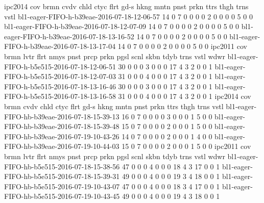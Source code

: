 ipc2014                                         cov  brmn  cvdv  chld  ctyc  flrt  gd-s  hkng  mntn  pnst  prkn  ttrs  thgh  trns  vstl  
bl1-eager-FIFO-h-b39eae-2016-07-18-12-06-57     14   0     7     0     0     0     0     2     0     0     0     0     5     0     0  
bl1-eager-FIFO-h-b39eae-2016-07-18-12-07-09     14   0     7     0     0     0     0     2     0     0     0     0     5     0     0  
bl1-eager-FIFO-h-b39eae-2016-07-18-13-16-52     14   0     7     0     0     0     0     2     0     0     0     0     5     0     0  
bl1-eager-FIFO-h-b39eae-2016-07-18-13-17-04     14   0     7     0     0     0     0     2     0     0     0     0     5     0     0  
ipc2011                                         cov  brmn  lvtr  flrt  nmys  pnst  prcp  prkn  pgsl  scnl  skbn  tdyb  trns  vstl  wdwr  
bl1-eager-FIFO-h-b5e515-2016-07-18-12-06-51     30   0     0     0     3     0     0     0     17    4     3     2     0     0     1  
bl1-eager-FIFO-h-b5e515-2016-07-18-12-07-03     31   0     0     0     4     0     0     0     17    4     3     2     0     0     1  
bl1-eager-FIFO-h-b5e515-2016-07-18-13-16-46     30   0     0     0     3     0     0     0     17    4     3     2     0     0     1  
bl1-eager-FIFO-h-b5e515-2016-07-18-13-16-58     31   0     0     0     4     0     0     0     17    4     3     2     0     0     1  
ipc2014                                         cov  brmn  cvdv  chld  ctyc  flrt  gd-s  hkng  mntn  pnst  prkn  ttrs  thgh  trns  vstl  
bl1-eager-FIFO-hb-b39eae-2016-07-18-15-39-13    16   0     7     0     0     0     0     3     0     0     0     1     5     0     0  
bl1-eager-FIFO-hb-b39eae-2016-07-18-15-39-48    15   0     7     0     0     0     0     2     0     0     0     1     5     0     0  
bl1-eager-FIFO-hb-b39eae-2016-07-19-10-43-26    14   0     7     0     0     0     0     2     0     0     0     1     4     0     0  
bl1-eager-FIFO-hb-b39eae-2016-07-19-10-44-03    15   0     7     0     0     0     0     2     0     0     0     1     5     0     0  
ipc2011                                         cov  brmn  lvtr  flrt  nmys  pnst  prcp  prkn  pgsl  scnl  skbn  tdyb  trns  vstl  wdwr  
bl1-eager-FIFO-hb-b5e515-2016-07-18-15-38-56    47   0     0     0     4     0     0     0     18    4     3     17    0     0     1  
bl1-eager-FIFO-hb-b5e515-2016-07-18-15-39-31    49   0     0     0     4     0     0     0     19    3     4     18    0     0     1  
bl1-eager-FIFO-hb-b5e515-2016-07-19-10-43-07    47   0     0     0     4     0     0     0     18    3     4     17    0     0     1  
bl1-eager-FIFO-hb-b5e515-2016-07-19-10-43-45    49   0     0     0     4     0     0     0     19    4     3     18    0     0     1  
